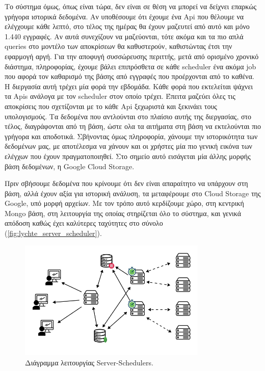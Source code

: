 Το σύστημα όμως, όπως είναι τώρα, δεν είναι σε θέση να μπορεί να δείχνει επαρκώς γρήγορα ιστορικά δεδομένα. Αν υποθέσουμε ότι έχουμε ένα Api που θέλουμε να ελέγχουμε κάθε
λεπτό, στο τέλος της ημέρας θα έχουν μαζευτεί από αυτό και μόνο 1.440 εγγραφές. Αν αυτά συνεχίζουν να μαζεύονται, τότε ακόμα και τα πιο απλά queries στο μοντέλο των αποκρίσεων θα καθυστερούν, καθιστώντας έτσι την εφαρμογή αργή. Για την αποφυγή συσσώρευσης περιττής, μετά από ορισμένο χρονικό διάστημα, πληροφορίας, έχουμε βάλει επιπρόσθετα σε κάθε scheduler ένα ακόμα job που αφορά
τον καθαρισμό της βάσης από εγγραφές που προέρχονται από το καθένα. Η διεργασία αυτή τρέχει μία φορά την εβδομάδα. Κάθε φορά που εκτελείται ψάχνει τα Apis ανάλογα με τον scheduler στον οποίο τρέχει.
Έπειτα μαζεύει όλες τις αποκρίσεις που σχετίζονται με το κάθε Api ξεχωριστά και ξεκινάει τους υπολογισμούς. Τα δεδομένα που αντλούνται στο πλαίσιο αυτής της διεργασίας, στο τέλος, διαγράφονται από τη βάση, ώστε ολα τα αιτήματα στη βάση να εκτελούνται πιο γρήγορα και αποδοτικά. Σβήνοντας όμως πληροφορία, χάνουμε την ιστορικότητα των δεδομένων μας, με αποτέλεσμα να χάνουν και οι χρήστες μία πιο γενική εικόνα των ελέγχων που έχουν πραγματοποιηθεί. Στο σημείο αυτό εισάγεται μία άλλης μορφής βάση δεδομένων, η Google Cloud Storage.

Πριν σβήσουμε δεδομένα που κρίνουμε ότι δεν είναι απαραίτητο να υπάρχουν στη βάση, αλλά έχουν αξία για ιστορική ανάλυση, τα μεταφέρουμε στο Cloud Storage της Google, υπό μορφή αρχείων.
Με τον τρόπο αυτό κερδίζουμε χώρο, στη κεντρική Mongo βάση, στη λειτουργία της οποίας στηρίζεται όλο το σύστημα, και γενικά απόδοση καθώς έχει καλύτερες ταχύτητες στο σύνολο (\autoref{fig:lychte_server_scheduler}). 

\begin{figure}[!ht]
	\centering
	\includegraphics[width=0.8\textwidth]{./images/chapter4/lychte-third-implementation-full.png}
	\caption[Διάγραμμα λειτουργίας Server-Schedulers.]{Διάγραμμα λειτουργίας Server-Schedulers.}
	\label{fig:lychte_server_scheduler}
\end{figure}

